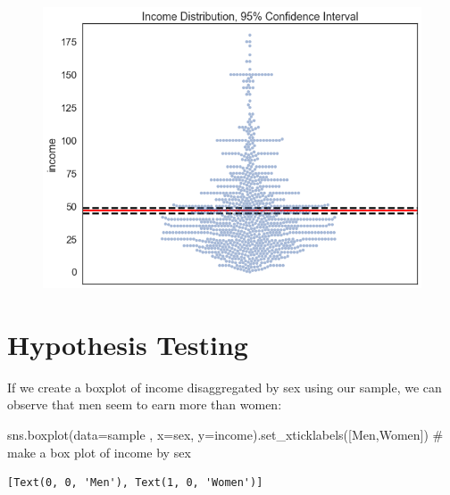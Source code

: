 \documentclass[
  letterpaper,
  DIV=11,
  numbers=noendperiod]{scrreprt}
\newenvironment{Shaded}{\begin{snugshade}}{\end{snugshade}}
\newcommand{\CommentTok}[1]{\textcolor[rgb]{0.37,0.37,0.37}{#1}}
\newcommand{\NormalTok}[1]{\textcolor[rgb]{0.00,0.23,0.31}{#1}}
\newcommand{\OperatorTok}[1]{\textcolor[rgb]{0.37,0.37,0.37}{#1}}
\newcommand{\StringTok}[1]{\textcolor[rgb]{0.13,0.47,0.30}{#1}}
\begin{document}
\begin{figure}[H]

{\centering \includegraphics{notebooks/W07. Hypothesis Testing_files/figure-pdf/cell-8-output-2.png}

}

\end{figure}

\hypertarget{hypothesis-testing-1}{%
\section{Hypothesis Testing}\label{hypothesis-testing-1}}

If we create a boxplot of income disaggregated by sex using our sample,
we can observe that men seem to earn more than women:

\begin{Shaded}
\begin{Highlighting}[]
\NormalTok{sns.boxplot(data}\OperatorTok{=}\NormalTok{sample , x}\OperatorTok{=}\StringTok{\textquotesingle{}sex\textquotesingle{}}\NormalTok{, y}\OperatorTok{=}\StringTok{\textquotesingle{}income\textquotesingle{}}\NormalTok{).set\_xticklabels([}\StringTok{\textquotesingle{}Men\textquotesingle{}}\NormalTok{,}\StringTok{\textquotesingle{}Women\textquotesingle{}}\NormalTok{]) }\CommentTok{\# make a box plot of income by sex}
\end{Highlighting}
\end{Shaded}

\begin{verbatim}
[Text(0, 0, 'Men'), Text(1, 0, 'Women')]
\end{verbatim}
\end{document}
